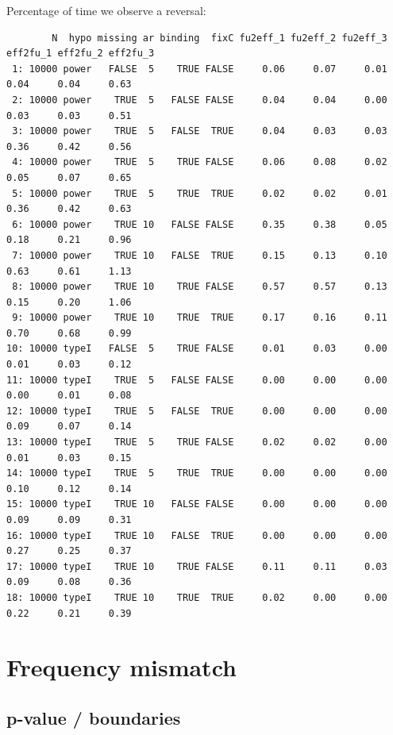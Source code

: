 \documentclass[12pt]{article}
\begin{document}
Percentage of time we observe a reversal:
\begin{adjustwidth}{-1cm}{-1cm}
\begin{verbatim}
        N  hypo missing ar binding  fixC fu2eff_1 fu2eff_2 fu2eff_3 eff2fu_1 eff2fu_2 eff2fu_3
 1: 10000 power   FALSE  5    TRUE FALSE     0.06     0.07     0.01     0.04     0.04     0.63
 2: 10000 power    TRUE  5   FALSE FALSE     0.04     0.04     0.00     0.03     0.03     0.51
 3: 10000 power    TRUE  5   FALSE  TRUE     0.04     0.03     0.03     0.36     0.42     0.56
 4: 10000 power    TRUE  5    TRUE FALSE     0.06     0.08     0.02     0.05     0.07     0.65
 5: 10000 power    TRUE  5    TRUE  TRUE     0.02     0.02     0.01     0.36     0.42     0.63
 6: 10000 power    TRUE 10   FALSE FALSE     0.35     0.38     0.05     0.18     0.21     0.96
 7: 10000 power    TRUE 10   FALSE  TRUE     0.15     0.13     0.10     0.63     0.61     1.13
 8: 10000 power    TRUE 10    TRUE FALSE     0.57     0.57     0.13     0.15     0.20     1.06
 9: 10000 power    TRUE 10    TRUE  TRUE     0.17     0.16     0.11     0.70     0.68     0.99
10: 10000 typeI   FALSE  5    TRUE FALSE     0.01     0.03     0.00     0.01     0.03     0.12
11: 10000 typeI    TRUE  5   FALSE FALSE     0.00     0.00     0.00     0.00     0.01     0.08
12: 10000 typeI    TRUE  5   FALSE  TRUE     0.00     0.00     0.00     0.09     0.07     0.14
13: 10000 typeI    TRUE  5    TRUE FALSE     0.02     0.02     0.00     0.01     0.03     0.15
14: 10000 typeI    TRUE  5    TRUE  TRUE     0.00     0.00     0.00     0.10     0.12     0.14
15: 10000 typeI    TRUE 10   FALSE FALSE     0.00     0.00     0.00     0.09     0.09     0.31
16: 10000 typeI    TRUE 10   FALSE  TRUE     0.00     0.00     0.00     0.27     0.25     0.37
17: 10000 typeI    TRUE 10    TRUE FALSE     0.11     0.11     0.03     0.09     0.08     0.36
18: 10000 typeI    TRUE 10    TRUE  TRUE     0.02     0.00     0.00     0.22     0.21     0.39
\end{verbatim}

\end{adjustwidth}


\clearpage

\section{Frequency mismatch}
\label{sec:org49bce0d}

\subsection{p-value / boundaries}
\label{sec:orgd89305d}
\end{document}
